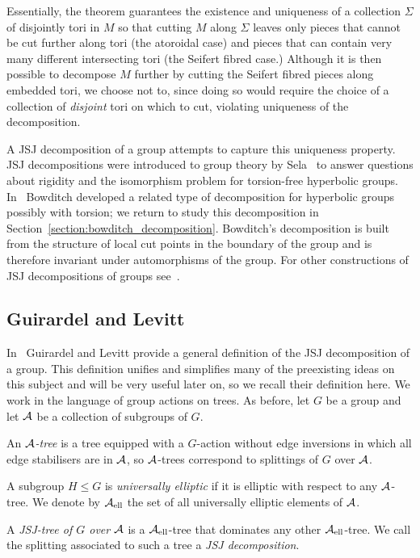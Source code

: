 Essentially, the theorem guarantees the existence and uniqueness of a collection $\Sigma$ of disjointly tori in $M$ so that cutting $M$ along $\Sigma$ leaves only pieces that cannot be cut further along tori (the atoroidal case) and pieces that can contain very many different intersecting tori (the Seifert fibred case.)
Although it is then possible to decompose $M$ further by cutting the Seifert fibred pieces along embedded tori, we choose not to, since doing so would require the choice of a collection of \emph{disjoint} tori on which to cut, violating uniqueness of the decomposition.

A JSJ decomposition of a group attempts to capture this uniqueness property.
JSJ decompositions were introduced to group theory by Sela~\cite{sela97} to answer questions about rigidity and the isomorphism problem for torsion-free hyperbolic groups. 
In~\cite{bowditch98} Bowditch developed a related type of decomposition for hyperbolic groups possibly with torsion; we return to study this decomposition in Section~\ref{section:bowditch_decomposition}.
Bowditch's decomposition is built from the structure of local cut points in the boundary of the group and is therefore invariant under automorphisms of the group.
For other constructions of JSJ decompositions of groups see~\cite{ripssela97,dunwoodysageev99,fujiwarapapsoglu06}.

\subsection{Guirardel and Levitt}\label{section:guirardellevitt}

In~\cite{guirardellevitt17} Guirardel and Levitt provide a general definition of the JSJ decomposition of a group.
This definition unifies and simplifies many of the preexisting ideas on this subject and will be very useful later on, so we recall their definition here.
We work in the language of group actions on trees.
As before, let $G$ be a group and let $\mathcal{A}$ be a collection of subgroups of $G$.

\begin{definition}\cite{guirardellevitt17}
  An \emph{$\mathcal{A}$-tree} is a tree equipped with a $G$-action without edge inversions in which all edge stabilisers are in $\mathcal{A}$, so $\mathcal{A}$-trees correspond to splittings of $G$ over $\mathcal{A}$.

  A subgroup $H \leq G$ is \emph{universally elliptic} if it is elliptic with respect to any $\mathcal{A}$-tree.
  We denote by $\mathcal{A}_{\mathrm{ell}}$ the set of all universally elliptic elements of $\mathcal{A}$.

  A \emph{JSJ-tree of $G$ over $\mathcal{A}$} is a $\mathcal{A}_{\mathrm{ell}}$-tree that dominates any other $\mathcal{A}_{\mathrm{ell}}$-tree. 
  We call the splitting associated to such a tree a \emph{JSJ decomposition}.
\end{definition}


